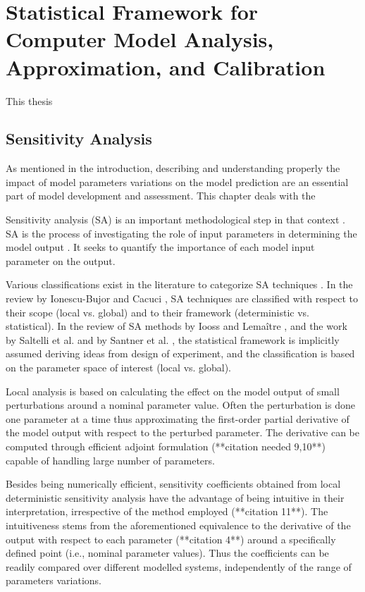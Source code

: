\section{Statistical Framework for Computer Model Analysis, Approximation, and Calibration}\label{sec:intro_statistical_framework}

This thesis 
\subsection{Sensitivity Analysis}
As mentioned in the introduction, describing and understanding properly the impact of model parameters variations on the model prediction are an essential part of model development and assessment. 
This chapter deals with the 

Sensitivity analysis (SA) is an important methodological step in that context \cite{Trucano2006}.
SA is the process of investigating the role of input parameters in determining the model output \cite{Iooss2015}. 
It seeks to quantify the importance of each model input parameter on the output.

Various classifications exist in the literature to categorize SA techniques \cite{Frey2002, Ionescu-Bujor2004, Cacuci2004, Saltelli2008, Iooss2015}.
In the review by Ionescu-Bujor and Cacuci \cite{Ionescu-Bujor2004, Cacuci2004}, 
SA techniques are classified with respect to their scope (local vs. global) and to their framework (deterministic vs. statistical).
In the review of SA methods by Iooss and Lemaître \cite{Iooss2015}, 
and the work by Saltelli et al. \cite{Saltelli2008} and by Santner et al. \cite{Santner2003}, 
the statistical framework is implicitly assumed deriving ideas from design of experiment, 
and the classification is based on the parameter space of interest (local vs. global).

Local analysis is based on calculating the effect on the model output of small perturbations around a nominal parameter value. 
Often the perturbation is done one parameter at a time thus approximating the first-order partial derivative of the model output with respect to the perturbed parameter. 
The derivative can be computed through efficient adjoint formulation (**citation needed 9,10**) capable of handling large number of parameters.

Besides being numerically efficient, 
sensitivity coefficients obtained from local deterministic sensitivity analysis have the advantage of being intuitive in their interpretation, 
irrespective of the method employed (**citation 11**). 
The intuitiveness stems from the aforementioned equivalence to the derivative of the output with respect to each parameter (**citation 4**) around a specifically defined point (i.e., nominal parameter values). 
Thus the coefficients can be readily compared over different modelled systems, independently of the range of parameters variations.

